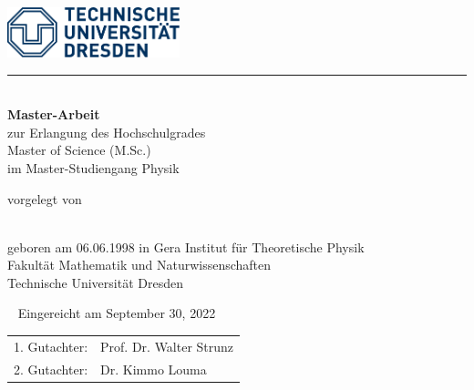 \makeatletter
\thispagestyle{empty}
\begin{titlepage}
  \includegraphics[width=5cm]{figs/logo.pdf}
  \vspace{1em}
  \hrule

  {\centering
  \vspace*{5em}
  {\bfseries\Huge \@title\\}
  \vspace*{2em}
  {\Large\@subtitle}
    \vfill \vfill
    {\large {\bfseries Master-Arbeit} \\
      zur Erlangung des Hochschulgrades\\
      Master of Science (M.Sc.)\\
      im Master-Studiengang Physik}

    \vfill vorgelegt von \vspace{1em}

  {{\large \@author} \\
  geboren am 06.06.1998 in Gera}
  \vfill
  {\large Institut f\"ur Theoretische Physik\\
    Fakultät Mathematik und Naturwissenschaften\\
    Technische Universität Dresden \\}
}

\newpage \thispagestyle{empty}\ \newpage
\clearpage
\thispagestyle{empty}
\null\vfill
{\large Eingereicht am September 30, 2022}

\begin{tabular*}{.5\linewidth}[h]{ll}
  1. Gutachter: & Prof. Dr. Walter Strunz \\
  2. Gutachter: & Dr. Kimmo Louma \\
\end{tabular*}
\end{titlepage}
\makeatother
